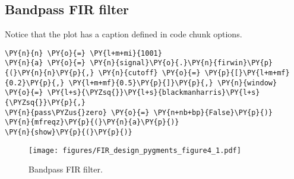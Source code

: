 \documentclass[a4paper,11pt,final]{article}
\begin{document}
\subsection{Bandpass FIR filter}

Notice that the plot has a caption defined in code chunk options.



\begin{Verbatim}[commandchars=\\\{\},frame=single,fontsize=\small, xleftmargin=0.5em]
\PY{n}{n} \PY{o}{=} \PY{l+m+mi}{1001}
\PY{n}{a} \PY{o}{=} \PY{n}{signal}\PY{o}{.}\PY{n}{firwin}\PY{p}{(}\PY{n}{n}\PY{p}{,} \PY{n}{cutoff} \PY{o}{=} \PY{p}{[}\PY{l+m+mf}{0.2}\PY{p}{,} \PY{l+m+mf}{0.5}\PY{p}{]}\PY{p}{,} \PY{n}{window} \PY{o}{=} \PY{l+s}{\PYZsq{}}\PY{l+s}{blackmanharris}\PY{l+s}{\PYZsq{}}\PY{p}{,}
\PY{n}{pass\PYZus{}zero} \PY{o}{=} \PY{n+nb+bp}{False}\PY{p}{)}
\PY{n}{mfreqz}\PY{p}{(}\PY{n}{a}\PY{p}{)}
\PY{n}{show}\PY{p}{(}\PY{p}{)}
\end{Verbatim}
\begin{figure}[htpb]
\center
\texttt{[image: figures/FIR\_design\_pygments\_figure4\_1.pdf]}
\caption{Bandpass FIR filter.}
\label{fig:None}
\end{figure}
\end{document}
